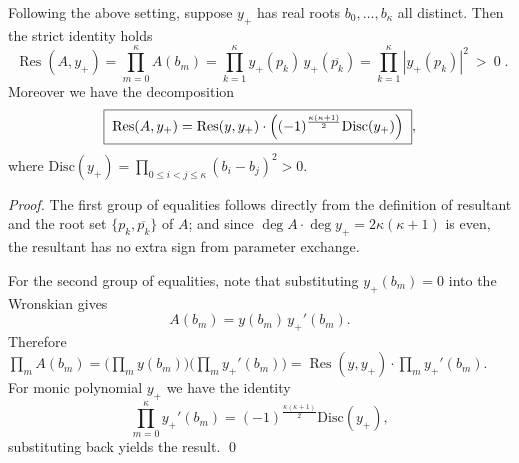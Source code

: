 \begin{conclusion}\label{con:xi-terminal-wronskian-resultant-discriminant-factorization}
Following the above setting, suppose \(y_{+}\) has real roots \(b_0,\dots,b_\kappa\) all distinct.
Then the strict identity holds
\[
\boxed{\;
\operatorname{Res}(A,y_{+})
=\prod_{m=0}^{\kappa}A(b_m)
=\prod_{k=1}^{\kappa}y_{+}(p_k)\,y_{+}(\overline{p_k})
=\prod_{k=1}^{\kappa}|y_{+}(p_k)|^{2}\ >\ 0\; }.
\]
Moreover we have the decomposition
\[
\boxed{\;
\operatorname{Res}(A,y_{+})
=\operatorname{Res}(y,y_{+})\cdot
\Bigl((-1)^{\frac{\kappa(\kappa+1)}{2}}\mathrm{Disc}(y_{+})\Bigr)\; },
\]
where
\(
\mathrm{Disc}(y_{+})=\prod_{0\le i<j\le \kappa}(b_i-b_j)^2>0
\).
\end{conclusion}
\begin{proof}
The first group of equalities follows directly from the definition of resultant and the root set \(\{p_k,\overline{p_k}\}\) of \(A\); and since \(\deg A\cdot\deg y_{+}=2\kappa(\kappa+1)\) is even, the resultant has no extra sign from parameter exchange.
\par
For the second group of equalities, note that substituting \(y_{+}(b_m)=0\) into the Wronskian gives
\[
A(b_m)=y(b_m)\,y_{+}'(b_m).
\]
Therefore
\(
\prod_m A(b_m)
=\bigl(\prod_m y(b_m)\bigr)\bigl(\prod_m y_{+}'(b_m)\bigr)
=\operatorname{Res}(y,y_{+})\cdot\prod_m y_{+}'(b_m)
\).
For monic polynomial \(y_{+}\) we have the identity
\[
\prod_{m=0}^{\kappa} y_{+}'(b_m)=(-1)^{\frac{\kappa(\kappa+1)}{2}}\mathrm{Disc}(y_{+}),
\]
substituting back yields the result. \qed
\end{proof}



